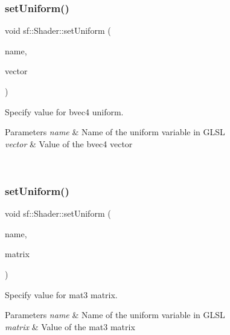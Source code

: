 \subsubsection{\texorpdfstring{setUniform()}{setUniform()}\hspace{0.1cm}{\footnotesize\ttfamily [12/16]}}
{\footnotesize\ttfamily void sf\+::\+Shader\+::set\+Uniform (\begin{DoxyParamCaption}\item[{const std\+::string \&}]{name,  }\item[{const \mbox{\hyperlink{structsf_1_1priv_1_1_vector4}{Glsl\+::\+Bvec4}} \&}]{vector }\end{DoxyParamCaption})}



Specify value for {\ttfamily bvec4} uniform. 


\begin{DoxyParams}{Parameters}
{\em name} & Name of the uniform variable in G\+L\+SL \\
\hline
{\em vector} & Value of the bvec4 vector \begin{DoxyVerb}\end{DoxyVerb}
 \\
\hline
\end{DoxyParams}
\mbox{\label{classsf_1_1_shader_ac1198ae0152d439bc05781046883e281}} 
\subsubsection{\texorpdfstring{setUniform()}{setUniform()}\hspace{0.1cm}{\footnotesize\ttfamily [13/16]}}
{\footnotesize\ttfamily void sf\+::\+Shader\+::set\+Uniform (\begin{DoxyParamCaption}\item[{const std\+::string \&}]{name,  }\item[{const \mbox{\hyperlink{structsf_1_1priv_1_1_matrix}{Glsl\+::\+Mat3}} \&}]{matrix }\end{DoxyParamCaption})}



Specify value for {\ttfamily mat3} matrix. 


\begin{DoxyParams}{Parameters}
{\em name} & Name of the uniform variable in G\+L\+SL \\
\hline
{\em matrix} & Value of the mat3 matrix \begin{DoxyVerb}\end{DoxyVerb}
 \\
\hline
\end{DoxyParams}
\mbox{\label{classsf_1_1_shader_aca5c55c4a3b23d21e33dbdaab7990755}} 
